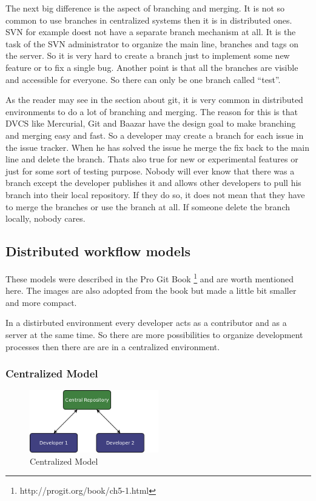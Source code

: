 The next big difference is the aspect of branching and merging. It is not so common to use branches 
in centralized systems then it is in distributed ones. SVN for example doest not have a separate branch 
mechanism at all.
It is the task of the SVN administrator to organize the main line, branches and tags on the server. 
So it is very hard to create a branch just to implement some new feature or to fix a single bug. Another 
point is that all the branches are visible and accessible for everyone. So there can only 
be one branch called “test”.

As the reader may see in the section about git, it is very common in distributed environments to 
do a lot of branching and merging. The reason for this is that DVCS like Mercurial, Git and Baazar 
have the design goal to make branching and merging easy and fast. So a developer may create a branch 
for each issue in the issue tracker. When he has solved the issue he merge the fix back to the main 
line and delete the branch. Thats also true for new or experimental features or just for some sort 
of testing purpose. Nobody will ever know that there was a branch except the developer publishes 
it and allows other developers to pull his branch into their local repository. If they do so, it 
does not mean that they have to merge the branches or use the branch at all. If someone delete 
the branch locally, nobody cares.


\subsection{Distributed workflow models}

These models were described in the Pro Git Book \footnote{http://progit.org/book/ch5-1.html} and are 
worth mentioned here. The images are also adopted from the book but made a little bit smaller and more compact.

In a distirbuted environment every developer acts as a contributor and as a server at the same time. So there are more 
possibilities to organize development processes then there are are in a centralized environment.


\subsubsection{Centralized Model}

\begin{figure}[ht]
  \centering
  \includegraphics[width=0.5\textwidth]{img/Mod_Central}
  \caption{Centralized Model}
  \label{fig:mod_centralized} 
\end{figure}

